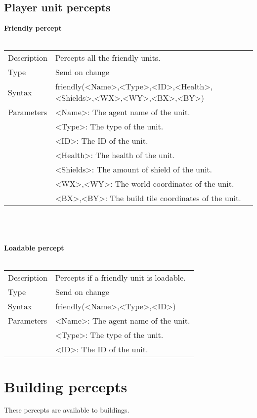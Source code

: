 \documentclass[english,11pt]{report}
\begin{document}
\subsection{Player unit percepts}
\textbf{Friendly percept}\\
\\
\begin{tabularx}{\textwidth}{lX}
 Description & Percepts all the friendly units. \\
 Type & Send on change \\
 Syntax & friendly(<Name>,<Type>,<ID>,<Health>,<Shields>,<WX>,<WY>,<BX>,<BY>) \\
 Parameters &   <Name>: The agent name of the unit.\\
            &   <Type>: The type of the unit.\\
            &   <ID>: The ID of the unit.\\
            &   <Health>: The health of the unit.\\
            &   <Shields>: The amount of shield of the unit.\\
            &   <WX>,<WY>: The world coordinates of the unit.\\
            &   <BX>,<BY>: The build tile coordinates of the unit.
\end{tabularx}\\
\\
\\
\textbf{Loadable percept}\\
\\
\begin{tabularx}{\textwidth}{lX}
 Description & Percepts if a friendly unit is loadable. \\
 Type & Send on change \\
 Syntax & friendly(<Name>,<Type>,<ID>) \\
 Parameters &   <Name>: The agent name of the unit.\\
            &   <Type>: The type of the unit.\\
            &   <ID>: The ID of the unit.
\end{tabularx}

\newpage
\section{Building percepts}
These percepts are available to buildings.
\end{document}
